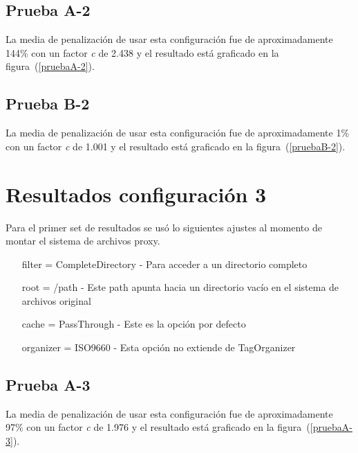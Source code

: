 \subsection{Prueba A-2}

La media de penalización de usar esta configuración fue de aproximadamente 144\% con un factor \textit{c} de  2.438 y el resultado está graficado en la figura~(\ref{pruebaA-2}).


\subsection{Prueba B-2}

La media de penalización de usar esta configuración fue de aproximadamente 1\% con un factor \textit{c} de 1.001 y el resultado está graficado en la figura~(\ref{pruebaB-2}).


\section{Resultados configuración 3}

Para el primer set de resultados se usó lo siguientes ajustes al momento de montar el sistema de archivos proxy.

\begin{itemize}
\item[filter] = CompleteDirectory - Para acceder a un directorio completo
\item[root] = /path - Este path apunta hacia un directorio vacío en el sistema de archivos original
\item[cache] = PassThrough - Este es la opción por defecto
\item[organizer] = ISO9660 - Esta opción no extiende de TagOrganizer
\end{itemize}

\subsection{Prueba A-3}

La media de penalización de usar esta configuración fue de aproximadamente 97\% con un factor \textit{c} de 1.976 y el resultado está graficado en la figura~(\ref{pruebaA-3}).

